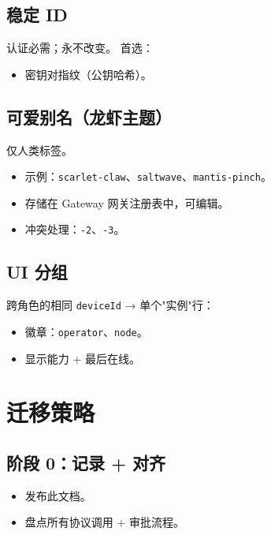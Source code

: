 \subsection{稳定 ID}


认证必需；永不改变。
首选：

\begin{itemize}
  \item 密钥对指纹（公钥哈希）。
\end{itemize}


\subsection{可爱别名（龙虾主题）}


仅人类标签。

\begin{itemize}
  \item 示例：\texttt{scarlet-claw}、\texttt{saltwave}、\texttt{mantis-pinch}。
  \item 存储在 Gateway 网关注册表中，可编辑。
  \item 冲突处理：\texttt{-2}、\texttt{-3}。
\end{itemize}


\subsection{UI 分组}


跨角色的相同 \texttt{deviceId} → 单个"实例"行：

\begin{itemize}
  \item 徽章：\texttt{operator}、\texttt{node}。
  \item 显示能力 + 最后在线。
\end{itemize}


\hrulefill


\section{迁移策略}


\subsection{阶段 0：记录 + 对齐}


\begin{itemize}
  \item 发布此文档。
  \item 盘点所有协议调用 + 审批流程。
\end{itemize}


